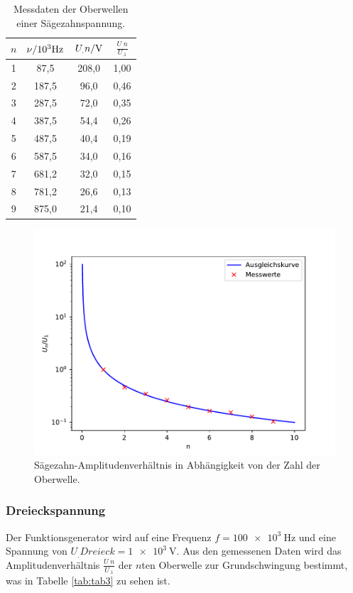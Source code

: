 \begin{table}
	\centering
	\caption{Messdaten der Oberwellen einer Sägezahnspannung.}
	\begin{tabular}{S[table-format=1.0] S[table-format=3.1]S[table-format=3.1]S[table-format=1.2]}
		\toprule
		{$n$}&{$\nu/10^3\si[per-mode=reciprocal]{\hertz}$}&{$U_.n/\si[per-mode=reciprocal]{\volt}$}&{$\frac{U_.n}{U_.1}$} \\
		 & 87,5 & 208,0 & 1,00 \\
		2 & 187,5 & 96,0 & 0,46 \\
		3 & 287,5 & 72,0 & 0,35 \\
		4 & 387,5 & 54,4 & 0,26 \\
		5 & 487,5 & 40,4 & 0,19 \\
		6 & 587,5 & 34,0 & 0,16 \\
		7 & 681,2 & 32,0 & 0,15 \\
		8 & 781,2 & 26,6 & 0,13 \\
		9 & 875,0 & 21,4 & 0,10 \\
		\bottomrule
	\end{tabular}
	\label{tab:tab2}
\end{table}

\begin{figure}
\centering
\includegraphics[width=\linewidth-75pt,height=\textheight-75pt,keepaspectratio]{content/images/saegezahn.pdf}
\caption{Sägezahn-Amplitudenverhältnis in Abhängigkeit von der Zahl der Oberwelle.}\label{fig:S}
\end{figure}

\subsubsection{Dreieckspannung}
Der Funktionsgenerator wird auf eine Frequenz $f=\SI{100e3}{\hertz}$ und eine Spannung von $U_.{Dreieck} = \SI{1e3}{\volt}$.\newline
Aus den gemessenen Daten wird das Amplitudenverhältnis $\frac{U_.n}{U_.1}$ der $n$ten Oberwelle zur Grundschwingung bestimmt, was in Tabelle \ref{tab:tab3} zu sehen ist.

